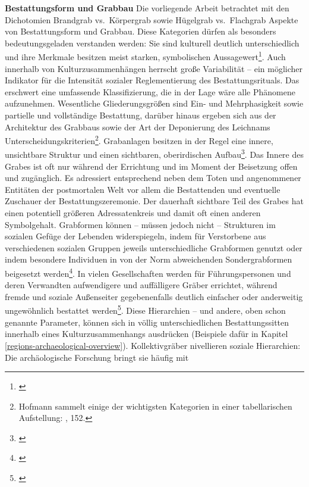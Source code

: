 \documentclass[openany,twoside,twocolumn]{book}
\let\rmarkdownfootnote\footnote%
\def\footnote{\protect\rmarkdownfootnote}
\begin{document}
\textbf{Bestattungsform und Grabbau} \newline  Die vorliegende Arbeit
betrachtet mit den Dichotomien Brandgrab vs.~Körpergrab sowie Hügelgrab
vs.~Flachgrab Aspekte von Bestattungsform und Grabbau. Diese Kategorien
dürfen als besonders bedeutungsgeladen verstanden werden: Sie sind
kulturell deutlich unterschiedlich und ihre Merkmale besitzen meist
starken, symbolischen Aussagewert\footnote{\textcite{kaliff_grave_1998}}.
Auch innerhalb von Kulturzusammenhängen herrscht große Variabilität --
ein möglicher Indikator für die Intensität sozialer Reglementierung des
Bestattungsrituals. Das erschwert eine umfassende Klassifizierung, die
in der Lage wäre alle Phänomene aufzunehmen. Wesentliche
Gliederungsgrößen sind Ein- und Mehrphasigkeit sowie partielle und
vollständige Bestattung, darüber hinaus ergeben sich aus der Architektur
des Grabbaus sowie der Art der Deponierung des Leichnams
Unterscheidungskriterien\footnote{Hofmann sammelt einige der wichtigsten
  Kategorien in einer tabellarischen Aufstellung:
  \textcite{hofmann_rituelle_2008}, 152.}. Grabanlagen besitzen in der
Regel eine innere, unsichtbare Struktur und einen sichtbaren,
oberirdischen Aufbau\footnote{\textcite{skjoldebrand_variations_1995}}.
Das Innere des Grabes ist oft nur während der Errichtung und im Moment
der Beisetzung offen und zugänglich. Es adressiert entsprechend neben
dem Toten und angenommener Entitäten der postmortalen Welt vor allem die
Bestattenden und eventuelle Zuschauer der Bestattungszeremonie. Der
dauerhaft sichtbare Teil des Grabes hat einen potentiell größeren
Adressatenkreis und damit oft einen anderen Symbolgehalt. Grabformen
können -- müssen jedoch nicht -- Strukturen im sozialen Gefüge der
Lebenden widerspiegeln, indem für Verstorbene aus verschiedenen sozialen
Gruppen jeweils unterschiedliche Grabformen genutzt oder indem besondere
Individuen in von der Norm abweichenden Sondergrabformen beigesetzt
werden\footnote{\textcite{hodder_social_1980}}. In vielen Gesellschaften
werden für Führungspersonen und deren Verwandten aufwendigere und
auffälligere Gräber errichtet, während fremde und soziale Außenseiter
gegebenenfalls deutlich einfacher oder anderweitig ungewöhnlich
bestattet werden\footnote{\textcite{pauli_ungewohnliche_1978}}. Diese
Hierarchien -- und andere, oben schon genannte Parameter, können sich in
völlig unterschiedlichen Bestattungssitten innerhalb eines
Kulturzusammenhangs ausdrücken (Beispiele dafür in Kapitel
\ref{regions-archaeological-overview}). Kollektivgräber nivellieren
soziale Hierarchien: Die archäologische Forschung bringt sie häufig mit
\end{document}
